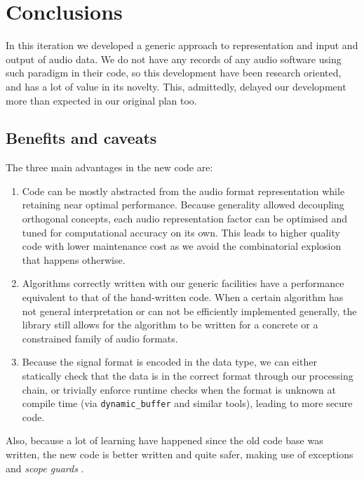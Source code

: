 \section{Conclusions}

In this iteration we developed a generic approach to representation
and input and output of audio data. We do not have any records of any
audio software using such paradigm in their code, so this development
have been research oriented, and has a lot of value in its
novelty. This, admittedly, delayed our development more than expected
in our original plan too.

\subsection{Benefits and caveats}
\label{sec:soundbenefits}

The three main advantages in the new code are:
\begin{enumerate}
\item Code can be mostly abstracted from the audio format
  representation while retaining near optimal performance. Because
  generality allowed decoupling orthogonal concepts, each audio
  representation factor can be optimised and tuned for computational
  accuracy on its own. This leads to higher quality code with lower
  maintenance cost as we avoid the combinatorial explosion that
  happens otherwise.

\item Algorithms correctly written with our generic facilities have a
  performance equivalent to that of the hand-written code. When a
  certain algorithm has not general interpretation or can not be
  efficiently implemented generally, the library still allows for the
  algorithm to be written for a concrete or a constrained family
  of audio formats.

\item Because the signal format is encoded in the data type, we can
  either statically check that the data is in the correct format
  through our processing chain, or trivially enforce runtime checks
  when the format is unknown at compile time (via
  \texttt{dynamic\_buffer} and similar tools), leading to more secure
  code.
\end{enumerate}

Also, because a lot of learning have happened since the old code base
was written, the new code is better written and quite safer, making
use of exceptions and \emph{scope guards}
\cite{alexandrescu00gener}.

